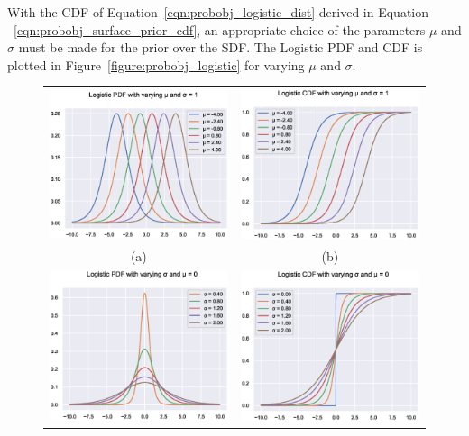 With the CDF of Equation~\ref{eqn:probobj_logistic_dist} derived in Equation
~\ref{eqn:probobj_surface_prior_cdf}, an appropriate choice of the parameters \( \mu \)
and \( \sigma \) must be made for the prior over the SDF\@. The Logistic PDF and CDF is 
plotted in Figure~\ref{figure:probobj_logistic} for varying \( \mu \) and \( \sigma \).
\begin{figure}[!htbp]
	\centering
	\begin{tabular}{cc}
		\includegraphics[width=.4\linewidth]{figures/object_recon/logistic/mu_pdf.eps}&
    \includegraphics[width=.4\linewidth]{figures/object_recon/logistic/mu_cdf.eps} \\
    (a) & (b) \\
		\includegraphics[width=.4\linewidth]{figures/object_recon/logistic/sigma_pdf.eps}&
    \includegraphics[width=.4\linewidth]{figures/object_recon/logistic/sigma_cdf.eps} \\

\end{tabular}
\end{figure}
